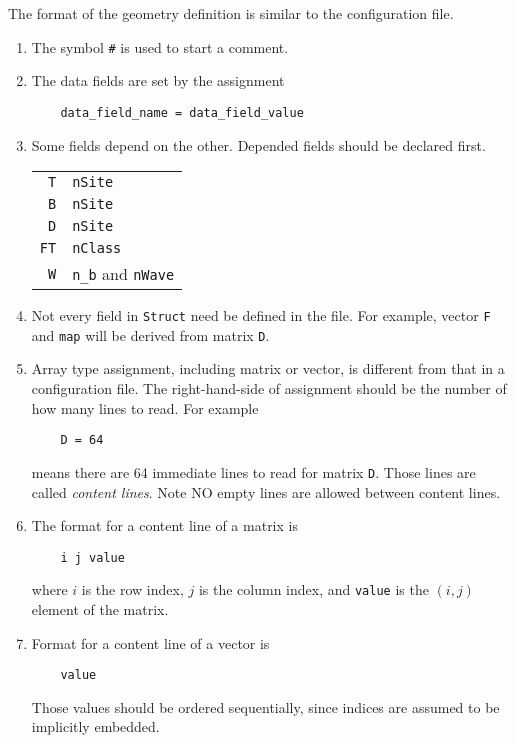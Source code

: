 \documentclass[12pt]{article}
\begin{document}
The format of the geometry definition is similar to the configuration file.
\begin{enumerate}
  \item The symbol \verb"#" is used to start a comment.
  \item The data fields are set by the assignment
\begin{verbatim}
    data_field_name = data_field_value
\end{verbatim}
  \item Some fields depend on the other. Depended fields should be declared first.

    \begin{center}
    \begin{tabular}{r@{ $\rightarrow$ }l}
      \verb"T"  & \verb"nSite" \\
      \verb"B"  & \verb"nSite"\\
      \verb"D"  & \verb"nSite" \\
      \verb"FT" & \verb"nClass" \\
      \verb"W"  & \verb"n_b" and \verb"nWave" \\
    \end{tabular}
    \end{center}
  \item Not every field in \verb"Struct" need be defined in the file. For example, vector \verb"F" and \verb"map" will be derived from matrix \verb"D".
  \item Array type assignment, including matrix or vector, is different from that in a configuration file. The right-hand-side of assignment should be the number of how many lines to read. For example
\begin{verbatim}
    D = 64
\end{verbatim}
      means there are 64 immediate lines to read for matrix \verb"D". Those lines are called \emph{content lines}. Note NO empty lines are allowed between content lines.
  \item The format for a content line of a matrix is
\begin{verbatim}
    i j value
\end{verbatim}
       where $i$ is the row index, $j$ is the column index, and \verb"value" is the $(i,j)$ element of the matrix.
  \item Format for a content line of a vector is
\begin{verbatim}
    value
\end{verbatim}
       Those values should be ordered sequentially, since indices are assumed to be implicitly embedded.
\end{enumerate}
\end{document}
